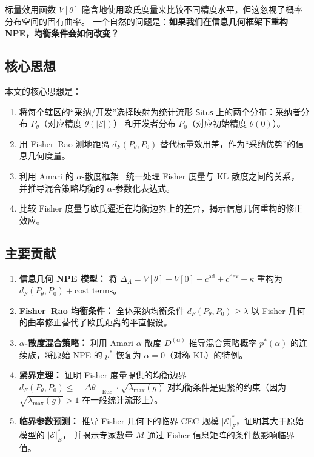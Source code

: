 \documentclass[12pt,a4paper]{article}
\theoremstyle{definition}
\theoremstyle{remark}
\newcommand{\Fisher}{g}
\newcommand{\Situs}{\mathsf{Situs}}
\begin{document}
标量效用函数 $V[\theta]$ 隐含地使用欧氏度量来比较不同精度水平，但这忽视了概率分布空间的固有曲率。
一个自然的问题是：\textbf{如果我们在信息几何框架下重构 NPE，均衡条件会如何改变？}

\subsection{核心思想}

本文的核心思想是：
\begin{enumerate}[label=(\arabic*)]
    \item 将每个辖区的“采纳/开发”选择映射为统计流形 $\Situs$ 上的两个分布：采纳者分布 $P_\theta$（对应精度 $\theta(|\mathcal{E}|)$）
    和开发者分布 $P_0$（对应初始精度 $\theta(0)$）。
    \item 用 Fisher--Rao 测地距离 $d_F(P_\theta, P_0)$ 替代标量效用差，作为“采纳优势”的信息几何度量。
    \item 利用 Amari 的 $\alpha$-散度框架~\cite{amari1985differential} 统一处理 Fisher 度量与 KL 散度之间的关系，
    并推导混合策略均衡的 $\alpha$-参数化表达式。
    \item 比较 Fisher 度量与欧氏逼近在均衡边界上的差异，揭示信息几何重构的修正效应。
\end{enumerate}

\subsection{主要贡献}

\begin{enumerate}[label=(\textbf{C\arabic*}), leftmargin=*]
    \item \textbf{信息几何 NPE 模型：} 将 $\Delta_A = V[\theta] - V[0] - c^{\text{ad}} + c^{\text{dev}} + \kappa$
    重构为 $d_F(P_\theta, P_0) + \text{cost terms}$。
    \item \textbf{Fisher--Rao 均衡条件：} 全体采纳均衡条件 $d_F(P_\theta, P_0) \geq \lambda$
    以 Fisher 几何的曲率修正替代了欧氏距离的平直假设。
    \item \textbf{$\alpha$-散度混合策略：} 利用 Amari $\alpha$-散度 $D^{(\alpha)}$ 推导混合策略概率
    $p^*(\alpha)$ 的连续族，将原始 NPE 的 $p^*$ 恢复为 $\alpha=0$（对称 KL）的特例。
    \item \textbf{紧界定理：} 证明 Fisher 度量提供的均衡边界 $d_F(P_\theta, P_0) \leq \|\Delta\theta\|_{\text{Euc}} \cdot \sqrt{\lambda_{\max}(\Fisher)}$
    对均衡条件是更紧的约束（因为 $\sqrt{\lambda_{\max}(\Fisher)} > 1$ 在一般统计流形上）。
    \item \textbf{临界参数预测：} 推导 Fisher 几何下的临界 CEC 规模 $|\mathcal{E}|^*_F$，证明其大于原始模型的 $|\mathcal{E}|^*_E$，
    并揭示专家数量 $M$ 通过 Fisher 信息矩阵的条件数影响临界值。
\end{enumerate}
\end{document}
